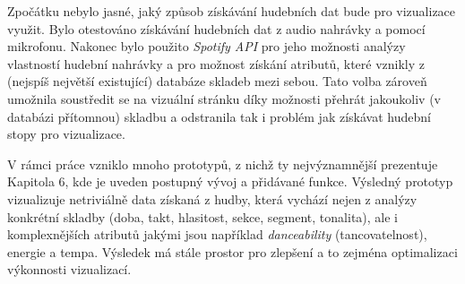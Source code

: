 \documentclass[thesis=B, czech]{FITthesis}[2019/03/06]
\begin{document}
\begin{conclusion}
Zpočátku nebylo jasné, jaký způsob získávání hudebních dat bude pro vizualizace využit. Bylo otestováno získávání hudebních dat z audio nahrávky a pomocí mikrofonu. Nakonec bylo použito \textit{Spotify API} pro jeho možnosti analýzy vlastností hudební nahrávky a pro možnost získání atributů, které vznikly z (nejspíš největší existující) databáze skladeb mezi sebou. Tato volba zároveň umožnila soustředit se na vizuální stránku díky možnosti přehrát jakoukoliv (v databázi přítomnou) skladbu  a odstranila tak i problém jak získávat hudební stopy pro vizualizace.

V rámci práce vzniklo mnoho prototypů, z nichž ty nejvýznamnější prezentuje Kapitola 6, kde je uveden postupný vývoj a přidávané funkce. Výsledný prototyp vizualizuje netriviálně data získaná z hudby, která vychází nejen z analýzy konkrétní skladby (doba, takt, hlasitost, sekce, segment, tonalita), ale i komplexnějších atributů jakými jsou například \textit{danceability} (tancovatelnost), energie a tempa. Výsledek má stále prostor pro zlepšení a to zejména optimalizaci výkonnosti vizualizací.













\end{conclusion}




\appendix
\end{document}
